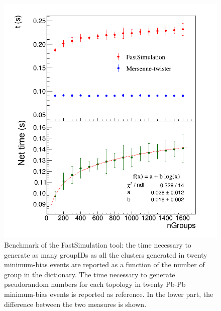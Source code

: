 %
\begin{figure}
  \centering
  \includegraphics[scale=0.4]{figures/fastbench.png}
  \caption{Benchmark of the FastSimulation tool: the time necessary to generate as many groupIDs as all the clusters generated in twenty minimum-bias events are reported as a function of the number of group in the dictionary. The time necessary to generate pseudorandom numbers for each topology in twenty Pb-Pb minimum-bias events is reported as reference. In the lower part, the difference between the two measures is shown.}
  \label{fig:fastbench}
\end{figure}
%
